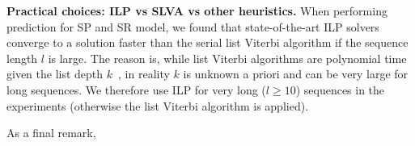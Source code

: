 \textbf{Practical choices: ILP vs SLVA vs other heuristics.}
When performing prediction for SP and SR model, we found that state-of-the-art ILP solvers converge to a solution faster 
than the serial list Viterbi algorithm if the sequence length $l$ is large. 
The reason is, while list Viterbi algorithms are polynomial time given the list depth $k$~\cite{nilsson2001sequentially},
in reality $k$ is unknown a priori and can be very large for long sequences.
We therefore use ILP for very long ($l\ge10$) sequences in the experiments (otherwise the list Viterbi algorithm is applied).

As a final remark,





